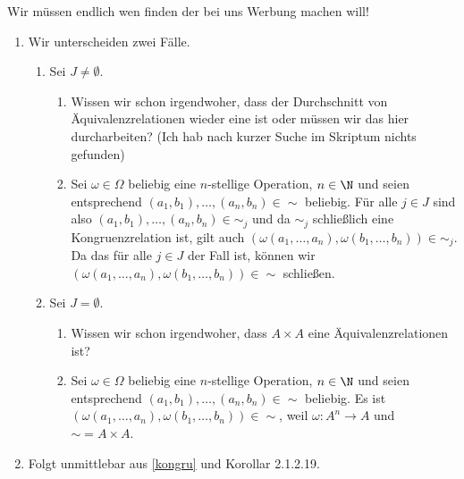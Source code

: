 \begin{solution} 
    Wir müssen endlich wen finden der bei uns Werbung machen will!
    \begin{enumerate}[label = \alph*)]
        \item Wir unterscheiden zwei Fälle.
        \begin{enumerate}[label = Fall \arabic*:]
            \item Sei $J \neq \emptyset$.
            \begin{enumerate}[label = (\roman*)]
                \item Wissen wir schon irgendwoher, dass der Durchschnitt von Äquivalenzrelationen wieder eine ist oder müssen wir das hier durcharbeiten? (Ich hab nach kurzer Suche im Skriptum nichts gefunden)
                \item Sei $\omega \in \Omega$ beliebig eine $n$-stellige Operation, $n \in \N$ und seien entsprechend $(a_1, b_1), \dots, (a_n, b_n) \in \sim$ beliebig. Für alle $j \in J$ sind also $(a_1, b_1), \dots, (a_n, b_n) \in \sim_j$ und da $\sim_j$ schließlich eine Kongruenzrelation ist, gilt auch $(\omega(a_1, \dots, a_n), \omega(b_1, \dots, b_n)) \in \sim_j$. Da das für alle $j \in J$ der Fall ist, können wir $(\omega(a_1, \dots, a_n), \omega(b_1, \dots, b_n)) \in \sim$ schließen. 
            \end{enumerate}
            \item Sei $J = \emptyset$.
            \begin{enumerate}[label = (\roman*)]
                \item Wissen wir schon irgendwoher, dass $A \times A$ eine Äquivalenzrelationen ist?
                \item Sei $\omega \in \Omega$ beliebig eine $n$-stellige Operation, $n \in \N$ und seien entsprechend $(a_1, b_1), \dots, (a_n, b_n) \in \sim$ beliebig. Es ist $(\omega(a_1, \dots, a_n), \omega(b_1, \dots, b_n)) \in \sim$, weil $\omega: A^n \to A$ und $\sim = A \times A$.
            \end{enumerate}
        \end{enumerate}
        \item Folgt unmittlebar aus \ref{kongru} und Korollar 2.1.2.19. 
    \end{enumerate}
\end{solution}